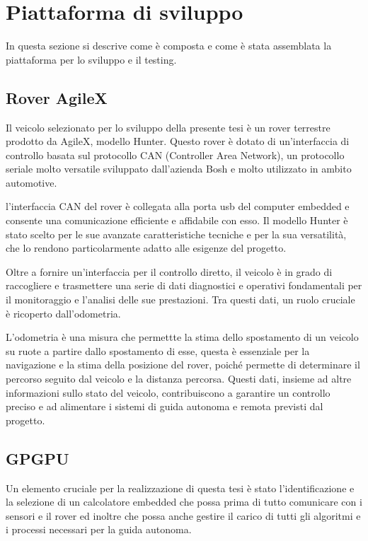 \section{Piattaforma di sviluppo}
In questa sezione si descrive come è composta e come è stata assemblata la piattaforma per lo sviluppo e il testing.
\subsection{Rover AgileX}
Il veicolo selezionato per lo sviluppo della presente tesi è un rover terrestre prodotto da AgileX, modello Hunter. Questo rover è dotato di un'interfaccia di controllo basata sul protocollo CAN (Controller Area Network), un protocollo seriale molto versatile sviluppato dall'azienda Bosh e molto utilizzato in ambito automotive. 

\noindent l'interfaccia CAN del rover è collegata alla porta usb del computer embedded e consente una comunicazione efficiente e affidabile con esso. Il modello Hunter è stato scelto per le sue avanzate caratteristiche tecniche e per la sua versatilità, che lo rendono particolarmente adatto alle esigenze del progetto.

\noindent Oltre a fornire un'interfaccia per il controllo diretto, il veicolo è in grado di raccogliere e trasmettere una serie di dati diagnostici e operativi fondamentali per il monitoraggio e l'analisi delle sue prestazioni. Tra questi dati, un ruolo cruciale è ricoperto dall'odometria. 

\noindent L'odometria è una misura che permettte la stima dello spostamento di un veicolo su ruote a partire dallo spostamento di esse, questa è essenziale per la navigazione e la stima della posizione del rover, poiché permette di determinare il percorso seguito dal veicolo e la distanza percorsa. Questi dati, insieme ad altre informazioni sullo stato del veicolo, contribuiscono a garantire un controllo preciso e ad alimentare i sistemi di guida autonoma e remota previsti dal progetto.

\subsection{GPGPU}
Un elemento cruciale per la realizzazione di questa tesi è stato l'identificazione e la selezione di un calcolatore embedded che possa prima di tutto comunicare con i sensori e il rover ed inoltre che possa anche gestire il carico di tutti gli algoritmi e i processi necessari per la guida autonoma.

